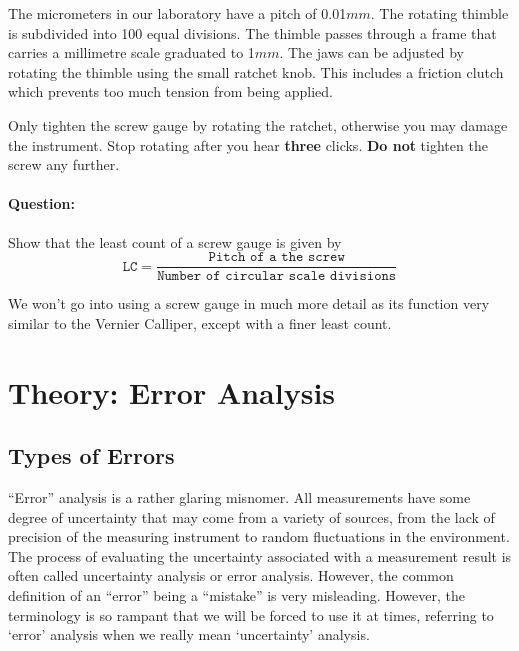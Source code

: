 The micrometers in our laboratory have a pitch of 0.01$mm$.  The rotating thimble is subdivided into 100 equal divisions.  The thimble passes through a frame that carries a millimetre scale graduated to 1$mm$.  The jaws can be adjusted by rotating the thimble using the small ratchet knob.  This includes a friction clutch which prevents too much tension from being applied.

\begin{imp}
Only tighten the screw gauge by rotating the ratchet, otherwise you may damage the instrument. Stop rotating after you hear \textbf{three} clicks. \textbf{Do not} tighten the screw any further.
\end{imp}

\begin{question}
\paragraph{Question:} Show that the least count of a screw gauge is given by
$$\texttt{LC} = \frac{\texttt{Pitch of a the screw}}{\texttt{Number of circular scale divisions}}$$
\end{question}

We won't go into using a screw gauge in much more detail as its function very similar to the Vernier Calliper, except with a finer least count.

\section{Theory: Error Analysis}

\subsection{Types of Errors}

``Error'' analysis is a rather glaring misnomer. All measurements have some degree of uncertainty that may come from a variety of sources, from the lack of precision of the measuring instrument to random fluctuations in the environment. The process of evaluating the uncertainty associated with a measurement result is often called uncertainty analysis or error analysis. However, the common definition of an ``error'' being a ``mistake'' is very misleading. However, the terminology is so rampant that we will be forced to use it at times, referring to `error' analysis when we really mean `uncertainty' analysis.


